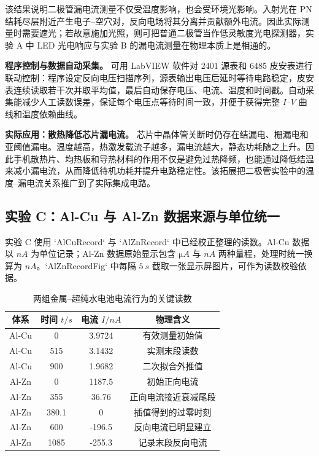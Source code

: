 \documentclass[11pt]{article}
\begin{document}
该结果说明二极管漏电流测量不仅受温度影响，也会受环境光影响。入射光在 PN 结耗尽层附近产生电子--空穴对，反向电场将其分离并贡献额外电流。因此实际测量时需要遮光；若故意施加光照，则可把普通二极管当作低灵敏度光电探测器，实验 A 中 LED 光电响应与实验 B 的漏电流测量在物理本质上是相通的。

\textbf{程序控制与数据自动采集。} 可用 LabVIEW 软件对 2401 源表和 6485 皮安表进行联动控制：程序设定反向电压扫描序列，源表输出电压后延时等待电路稳定，皮安表连续读取若干次并取平均值，最后自动保存电压、电流、温度和时间戳。自动采集能减少人工读数误差，保证每个电压点等待时间一致，并便于获得完整 $I$--$V$ 曲线和温度依赖曲线。

\textbf{实际应用：散热降低芯片漏电流。} 芯片中晶体管关断时仍存在结漏电、栅漏电和亚阈值漏电。温度越高，热激发载流子越多，漏电流越大，静态功耗随之上升。因此手机散热片、均热板和导热材料的作用不仅是避免过热降频，也能通过降低结温来减小漏电流，从而降低待机功耗并提升电路稳定性。该拓展把二极管实验中的温度--漏电流关系推广到了实际集成电路。

\subsection{实验 C：Al-Cu 与 Al-Zn 数据来源与单位统一}

实验 C 使用 `AlCuRecord` 与 `AlZnRecord` 中已经校正整理的读数。Al-Cu 数据以 $\si{nA}$ 为单位记录；Al-Zn 数据原始显示包含 $\si{\micro A}$ 与 $\si{nA}$ 两种量程，处理时统一换算为 $\si{nA}$。`AlZnRecordFig` 中每隔 $\SI{5}{s}$ 截取一张显示屏图片，可作为读数校验依据。

\begin{table}[H]
    \centering
    \caption{两组金属--超纯水电池电流行为的关键读数}
    \begin{tabular}{cccc}
        \toprule
        体系 & 时间 $t/\si{s}$ & 电流 $I/\si{nA}$ & 物理含义 \\
        \midrule
        Al-Cu & 0 & 3.9724 & 有效测量初始值 \\
        Al-Cu & 515 & 3.1432 & 实测末段读数 \\
        Al-Cu & 900 & 1.9682 & 二次拟合外推值 \\
        Al-Zn & 0 & 1187.5 & 初始正向电流 \\
        Al-Zn & 355 & 36.76 & 正向电流接近衰减尾段 \\
        Al-Zn & 380.1 & 0 & 插值得到的过零时刻 \\
        Al-Zn & 600 & -196.5 & 反向电流已明显建立 \\
        Al-Zn & 1085 & -255.3 & 记录末段反向电流 \\
        \bottomrule
    \end{tabular}
\end{table}
\end{document}
